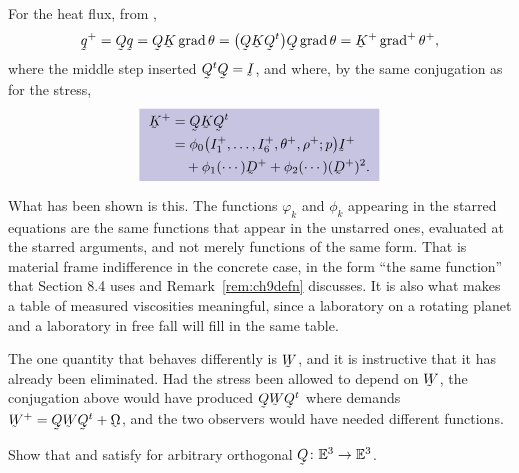 \begin{solution}
For the heat flux, from ,
\[
   \bq^{+}=\bQ\bq=\bQ\bK\grad\theta
   =\big(\bQ\bK\bQ^{t}\big)\bQ\grad\theta
   =\bK^{+}\grad^{+}\theta^{+},
\]
where the middle step inserted $\bQ^{t}\bQ=\I$, and where, by the same
conjugation as for the stress,
\[
   \boxed{\
\begin{aligned}
   \bK^{+}&=\bQ\bK\bQ^{t}\\
   &=\phi_{0}\big(I^{+}_{1},\ldots,I^{+}_{6},\theta^{+},\rho^{+};p\big)
     \I^{+}\\
   &\quad+\phi_{1}(\cdots)\bD^{+}+\phi_{2}(\cdots)(\bD^{+})^{2}.
\end{aligned}\ }
\]

What has been shown is this. The functions $\varphi_{k}$ and $\phi_{k}$
appearing in the starred equations are the same functions that
appear in the unstarred ones, evaluated at the starred arguments, and not
merely functions of the same form. That is material frame indifference
in the concrete case, in the form ``the same function'' that Section 8.4
uses and Remark~\ref{rem:ch9defn} discusses. It is also what makes a
table of measured viscosities meaningful, since a laboratory on a
rotating planet and a laboratory in free fall will fill in the same
table.

The one quantity that behaves differently is $\bW$, and it is instructive
that it has already been eliminated. Had the stress been allowed to
depend on $\bW$, the conjugation above would have produced
$\bQ\bW\bQ^{t}$ where  demands $\bW^{+}=\bQ\bW\bQ^{t}+\bOm$,
and the two observers would have needed different functions.
\end{solution}

\begin{problem}
Show that  and  satisfy  for arbitrary
orthogonal $\bQ\colon\Et\to\Et$.
\end{problem}

